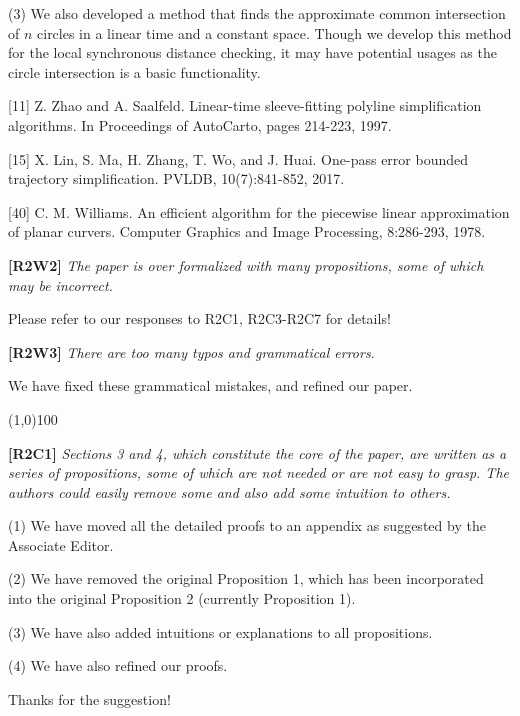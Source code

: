 \documentclass{letter}
\begin{document}
(3) We also developed a method that finds the approximate common intersection of $n$ circles in a linear time and a constant space. Though we develop this method for the local synchronous distance checking, it may have potential usages as the circle intersection is a basic functionality.


[11]  Z. Zhao and A. Saalfeld. Linear-time sleeve-fitting polyline simplification algorithms. In Proceedings of AutoCarto, pages 214-223, 1997.

[15] X. Lin, S. Ma, H. Zhang, T. Wo, and J. Huai. One-pass error bounded trajectory simplification. PVLDB, 10(7):841-852, 2017.

[40] C. M. Williams. An efficient algorithm for the piecewise linear approximation of planar curvers. Computer Graphics and Image Processing, 8:286-293, 1978.



\textbf{[R2W2]} \emph{The paper is over formalized with many propositions, some of which may be incorrect.}

Please refer to our responses to R2C1, R2C3-R2C7 for details!

\textbf{[R2W3]} \emph{There are too many typos and grammatical errors.}

We have fixed these grammatical mistakes, and refined our paper.

\line(1,0){100}

\textbf{[R2C1]} \emph{Sections 3 and 4, which constitute the core of the paper, are written as a series of propositions, some of which are not needed or are not easy to grasp. The authors could easily remove some and also add some intuition to others.}

(1) We have moved all the detailed proofs to an appendix as suggested by the Associate Editor.

(2) We have removed the original Proposition 1, which has been incorporated into the original Proposition 2 (currently Proposition 1).

(3) We have also added intuitions or explanations to all propositions.

(4) We have also refined our proofs.

Thanks for the suggestion!

\end{document}
